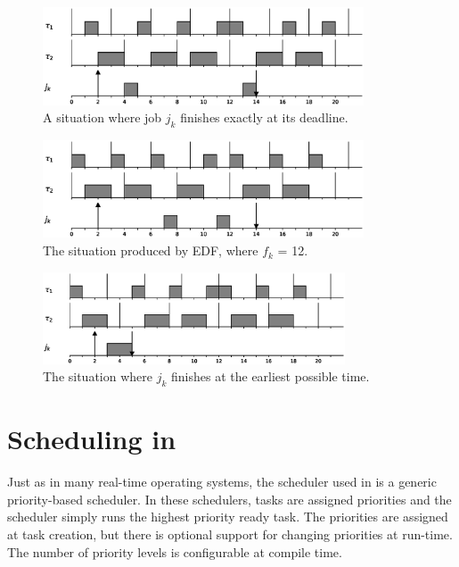 \begin{figure}[htpb]
    \centering
    \includegraphics[width=0.85\textwidth]{figures/worstcasedeadline.eps}
    \caption{A situation where job $j_k$ finishes exactly at its deadline.}
    \label{fig:tbsworstdeadline}
\end{figure}

\begin{figure}[htpb]
    \centering
    \includegraphics[width=0.85\textwidth]{figures/edfdeadline.eps}
    \caption{The situation produced by EDF, where $f_k$ = 12.}
    \label{fig:tbsedfdeadline}
\end{figure}

\begin{figure}[htpb]
    \centering
    \includegraphics[width=0.8\textwidth]{figures/optimaldeadline.eps}
    \caption{The situation where $j_k$ finishes at the earliest possible time.}
    \label{fig:tbsoptimaldeadline}
\end{figure}

\section{Scheduling in \ucosiii}
Just as in many real-time operating systems, the scheduler used in \ucosiii is a generic priority-based scheduler. In these schedulers, tasks are assigned priorities and the scheduler simply runs the highest priority ready task. The priorities are assigned at task creation, but there is optional support for changing priorities at run-time. The number of priority levels is configurable at compile time.

